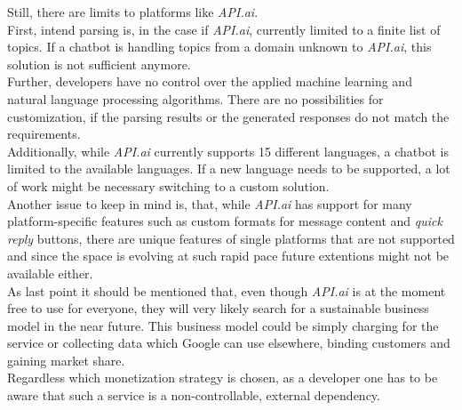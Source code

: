 Still, there are limits to platforms like \emph{API.ai}.
\\
First, intend parsing is, in the case if \emph{API.ai}, currently limited to a finite list of topics.
If a chatbot is handling topics from a domain unknown to \emph{API.ai}, this solution is not sufficient anymore.
\\
Further, developers have no control over the applied machine learning and natural language processing algorithms.
There are no possibilities for customization, if the parsing results or the generated responses do not match the requirements.
\\
Additionally, while \emph{API.ai} currently supports 15 different languages, a chatbot is limited to the available languages.
If a new language needs to be supported, a lot of work might be necessary switching to a custom solution.
\\
Another issue to keep in mind is, that, while \emph{API.ai} has support for many platform-specific features such as custom formats for message content and \emph{quick reply} buttons,
there are unique features of single platforms that are not supported
and since the space is evolving at such rapid pace future extentions might not be available either.
\\
As last point it should be mentioned that, even though \emph{API.ai} is at the moment free to use for everyone,
they will very likely search for a sustainable business model in the near future.
This business model could be simply charging for the service or collecting data which Google can use elsewhere, binding customers and gaining market share.
\\
Regardless which monetization strategy is chosen, as a developer one has to be aware that such a service is a non-controllable, external dependency.
